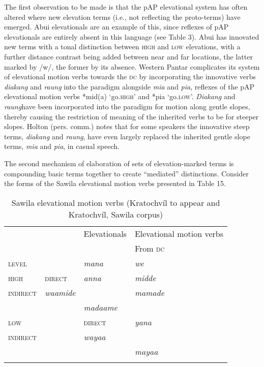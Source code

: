 The first observation to be made is that the pAP elevational system has often altered where new elevation terms (i.e., not reflecting the proto-terms) have emerged. Abui elevationals are an example of this, since reflexes of pAP elevationals are entirely absent in this language (see Table 3). Abui has innovated new terms with a tonal distinction between \textsc{high} and \textsc{low} elevations, with a further distance contrast being added between near and far locations, the latter marked by /w/, the former by its absence. Western Pantar complicates its system of elevational motion verbs towards the \textsc{dc} by incorporating the innovative verbs \textit{diakang} and \textit{raung} into the paradigm alongside \textit{mia} and \textit{pia}, reflexes of the pAP elevational motion verbs *mid(a) `go.\textsc{high'} and *pia `go.\textsc{low'.} \textit{Diakang} and \textit{raung}have been incorporated into the paradigm for motion along gentle slopes, thereby causing the restriction of meaning of the inherited verbs to be for steeper slopes. Holton (pers. comm.) notes that for some speakers the innovative steep terms, \textit{diakang} and \textit{raung}, have even largely replaced the inherited gentle slope terms, \textit{mia} and \textit{pia}, in casual speech.

The second mechanism of elaboration of sets of elevation-marked terms is compounding basic terms together to create ``mediated'' distinctions. Consider the forms of the Sawila elevational motion verbs presented in Table 15.




\begin{table}


\begin{tabular}{llll}
 &  & Elevationals& Elevational motion verbs\\
 &  &  & From \textsc{dc}\\
{\scshape level} &  & {\itshape mana}& {\itshape we}\\
{\scshape high} & {\scshape direct} & {\itshape anna}& {\itshape midde}\\
{\scshape indirect} & {\itshape waamide} &  & {\itshape mamade}\\
 &  & {\itshape madaame} & \\
\hhline{-~--}
{\scshape low} &  & {\scshape direct} & {\itshape yana}\\
{\scshape indirect} &  & {\itshape wayaa} & \\
 &  &  & {\itshape mayaa}\\
\hhline{~~~-}

\end{tabular}

\caption{Sawila elevational motion verbs (Kratochv\'il to appear and Kratochv\'il, Sawila corpus)}
\end{table}

